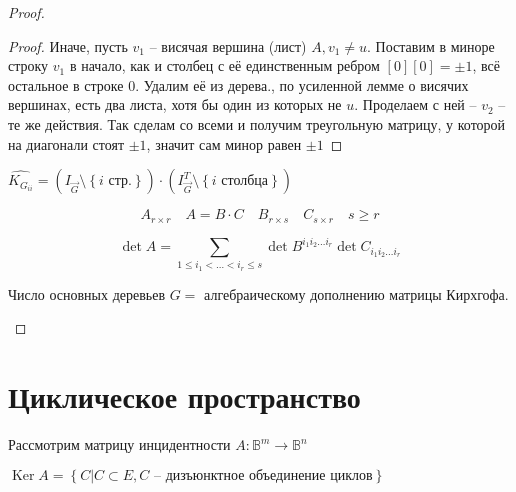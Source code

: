 \documentclass{book}
\theoremstyle{definition}
\DeclareMathOperator{\Ker}{Ker}
\begin{document}
\begin{proof}
\begin{proof}
            Иначе, пусть $v_1$ -- висячая вершина (лист)  $A, v_1\neq u$. Поставим в миноре строку $v_1$ в начало, как и столбец с её единственным ребром $[0][0] = \pm 1$, всё остальное в строке 0. Удалим её из дерева., по усиленной лемме о висячих вершинах, есть два листа, хотя бы один из которых не  $u$. Проделаем с ней --  $v_2$ -- те же действия. Так сделам со всеми и получим треугольную матрицу, у которой на диагонали стоят $\pm 1$, значит сам минор равен  $\pm 1$
        \end{proof}
        \begin{lemma}
            $\widehat{K_{G_{ii}}} = (I_{\vec G} \setminus  \left\{ i\text{ стр.} \right\})\cdot \left( I^T_{\vec G}\setminus \left\{ i \text{ столбца} \right\}  \right)  $
        \end{lemma}
        \begin{lemma}

        \[A_{r\times r}\quad A = B\cdot C\quad B_{r\times s}\quad C_{s\times r}\quad s \geqslant r\]

        \[\det A = \sum_{1\leqslant i_1<\ldots< i_r\leqslant s}\det B^{i_1i_2\ldots i_r}\det C_{i_1i_2\ldots i_r}\]
        \end{lemma}
        \begin{theorem}
            [lite]

            Число основных деревьев $G = $ алгебраическому дополнению матрицы Кирхгофа.
        \end{theorem}
    \end{proof}

    \section{Циклическое пространство}

    Рассмотрим матрицу инцидентности $A:\mathbb B^m \to \mathbb B^n$

    $\Ker A = \left\{ C|C\subset E, C \text{ -- дизъюнктное объединение циклов} \right\} $
\end{document}
